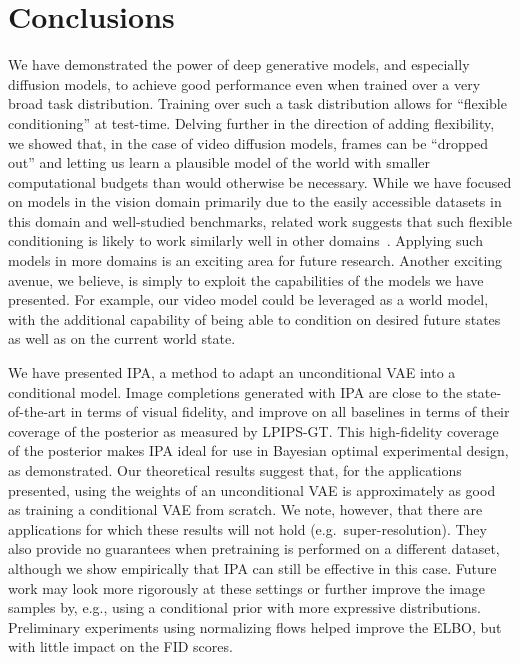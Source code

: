 \chapter{Conclusions}  \label{ch:conclusion}

We have demonstrated the power of deep generative models, and especially diffusion models, to achieve good performance even when trained over a very broad task distribution. Training over such a task distribution allows for ``flexible conditioning'' at test-time. Delving further in the direction of adding flexibility, we showed that, in the case of video diffusion models, frames can be ``dropped out'' and letting us learn a plausible model of the world with smaller computational budgets than would otherwise be necessary. While we have focused on models in the vision domain primarily due to the easily accessible datasets in this domain and well-studied benchmarks, related work suggests that such flexible conditioning is likely to work similarly well in other domains~\citep{weilbach2022graphically}. Applying such models in more domains is an exciting area for future research. Another exciting avenue, we believe, is simply to exploit the capabilities of the models we have presented. For example, our video model could be leveraged as a world model, with the additional capability of being able to condition on desired future states as well as on the current world state.


We have presented IPA, a method to adapt an unconditional VAE into a conditional model. Image completions generated with IPA are close to the state-of-the-art in terms of visual fidelity, and improve on all baselines in terms of their coverage of the posterior as measured by LPIPS-GT. This high-fidelity coverage of the posterior makes IPA ideal for use in Bayesian optimal experimental design, as demonstrated. Our theoretical results suggest that, for the applications presented, using the weights of an unconditional VAE is approximately as good as training a conditional VAE from scratch. We note, however, that there are applications for which these results will not hold (e.g.~super-resolution).
They also provide no guarantees when pretraining is performed on a different dataset, although we show empirically that IPA can still be effective in this
case. Future work may look more rigorously at these settings or further improve the
image samples by, e.g., using a conditional prior with more expressive
distributions.
%
Preliminary experiments using normalizing flows helped improve the ELBO, but
with little impact on the FID scores.